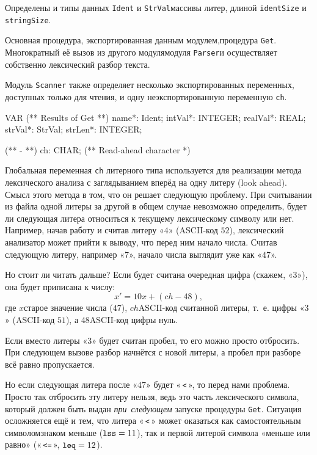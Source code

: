 \documentclass[utf8]{lgu}
\newcommand{\tire}{\unskip\nobreak\thinspace\textemdash\thinspace}
\newcommand{\code}[1]{{\normalsize\texttt{#1}}}
\begin{document}
Определены и типы данных \label{ScannerIdentType}\code{Ident} и \code{StrVal}\tire массивы литер, длиной \code{identSize} и \code{stringSize}.

Основная процедура, экспортированная данным модулем,\tire процедура \code{Get}. Многократный её вызов из другого модуля\tire модуля \code{Parser}\tire и осуществляет собственно лексический разбор текста.

Модуль \code{Scanner} также определяет несколько экспортированных переменных, доступных только для чтения, и одну неэкспортированную переменную \code{ch}.

\begin{listing}[H]
\caption{Глобальные переменные модуля Scanner}
\vspace{-17pt}
\begin{modula2}
VAR
  (** Results of Get **)
  name*: Ident;
  intVal*: INTEGER;
  realVal*: REAL;
  strVal*: StrVal;
  strLen*: INTEGER;

  (** - **)
  ch: CHAR; (** Read-ahead character *)
\end{modula2}
\end{listing}

Глобальная переменная \code{ch} литерного типа используется для реализации метода лексического анализа с заглядыванием вперёд на одну литеру (look ahead). Смысл этого метода в том, что он решает следующую проблему. При считывании из файла одной литеры за другой в общем случае невозможно определить, будет ли следующая литера относиться к текущему лексическому символу или нет. Например, начав работу и считав литеру «$4$» (ASCII-код $52$), лексический анализатор может прийти к выводу, что перед ним начало числа. Считав следующую литеру, например «$7$», начало числа выглядит уже как «$47$».

Но стоит ли читать дальше? Если будет считана очередная цифра (скажем, «$3$»), она будет приписана к числу:
$$x' = 10x +(\mathit{ch}-48),$$
\noindent где $x$\tire старое значение числа ($47$), $\mathit{ch}$\tire ASCII-код считанной литеры, т.~е. цифры «$3$» (ASCII-код $51$), а 48\tire ASCII-код цифры нуль.

Если вместо литеры «$3$» будет считан пробел, то его можно просто отбросить. При следующем вызове разбор начнётся с новой литеры, а пробел при разборе всё равно пропускается.

Но если следующая литера после «$47$» будет «\,\code{<}\,», то перед нами проблема. Просто так отбросить эту литеру нельзя, ведь это часть лексического символа, который должен быть выдан \textit{при~следующем} запуске процедуры \code{Get}. Ситуация осложняется ещё и тем, что литера «\,\code{<}\,» может оказаться как самостоятельным символом\tire знаком меньше ($\code{lss} = 11$), так и первой литерой символа «меньше или равно» («\,\code{<=}\,», $\code{leq} = 12$).
\end{document}
